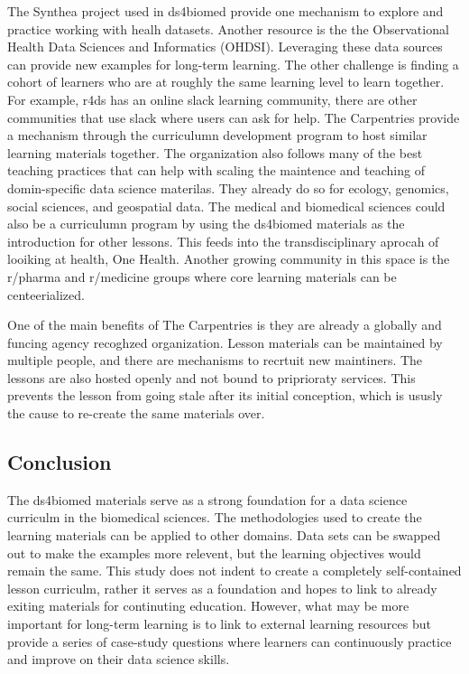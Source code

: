 \documentclass[020-persona_validation.tex]{subfiles}
\begin{document}
        The Synthea project used in ds4biomed provide one mechanism to explore and practice working with healh datasets.
        Another resource is the the Observational Health Data Sciences and Informatics (OHDSI).
        Leveraging these data sources can provide new examples for long-term learning.
        The other challenge is finding a cohort of learners who are at roughly the same learning level to learn together.
        For example, r4ds has an online slack learning community,
        there are other communities that use slack where users can ask for help.
        The Carpentries provide a mechanism through the curriculumn development program to host similar learning materials together.
        The organization also follows many of the best teaching practices that can help with scaling the maintence and
        teaching of domin-specific data science materilas.
        They already do so for ecology, genomics, social sciences, and geospatial data.
        The medical and biomedical sciences could also be a curriculumn program by using the ds4biomed materials as the introduction
        for other lessons.
        This feeds into the transdisciplinary aprocah of looiking at health, One Health.
        Another growing community in this space is the r/pharma and r/medicine groups where core learning materials
        can be centeerialized.

        One of the main benefits of The Carpentries is they are already a globally and funcing agency recoghzed organization.
        Lesson materials can be maintained by multiple people, and there are mechanisms to recrtuit new maintiners.
        The lessons are also hosted openly and not bound to priprioraty services.
        This prevents the lesson from going stale after its initial conception,
        which is ususly the cause to re-create the same materials over.

    \subsection{Conclusion}

        The ds4biomed materials serve as a strong foundation for a data science curriculm in the biomedical sciences.
        The methodologies used to create the learning materials can be applied to other domains.
        Data sets can be swapped out to make the examples more relevent,
        but the learning objectives would remain the same.
        This study does not indent to create a completely self-contained lesson curriculm,
        rather it serves as a foundation and hopes to link to already exiting materials for continuting education.
        However, what may be more important for long-term learning
        is to link to external learning resources but provide a series of case-study questions
        where learners can continuously practice and improve on their data science skills.
\end{document}
